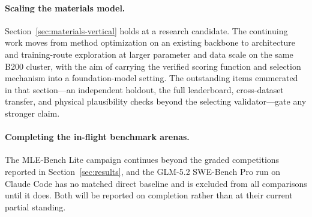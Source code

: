\paragraph{Scaling the materials model.}
Section~\ref{sec:materials-vertical} holds at a research candidate. The continuing
work moves from method optimization on an existing backbone to architecture and
training-route exploration at larger parameter and data scale on the same B200
cluster, with the aim of carrying the verified scoring function and selection
mechanism into a foundation-model setting. The outstanding items enumerated in that
section---an independent holdout, the full leaderboard, cross-dataset transfer, and
physical plausibility checks beyond the selecting validator---gate any stronger
claim.

\paragraph{Completing the in-flight benchmark arenas.}
The MLE-Bench Lite campaign continues beyond the \MLEGraded{} graded competitions
reported in Section~\ref{sec:results}, and the GLM-5.2 SWE-Bench Pro run on Claude
Code has no matched direct baseline and is excluded from all comparisons until it
does. Both will be reported on completion rather than at their current partial
standing.
